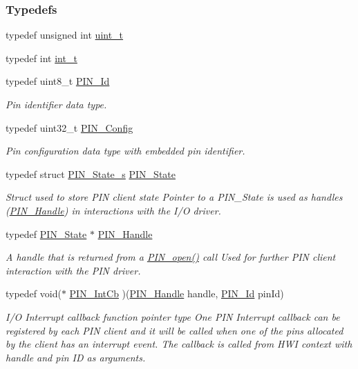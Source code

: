 \subsubsection*{Typedefs}
\begin{DoxyCompactItemize}
\item 
typedef unsigned int \hyperlink{_p_i_n_8h_a12a1e9b3ce141648783a82445d02b58d}{uint\-\_\-t}
\item 
typedef int \hyperlink{_p_i_n_8h_ab6fd6105e64ed14a0c9281326f05e623}{int\-\_\-t}
\item 
typedef uint8\-\_\-t \hyperlink{_p_i_n_8h_a9ae8197f460bb76ea09a84f47d09921f}{P\-I\-N\-\_\-\-Id}
\begin{DoxyCompactList}\small\item\em Pin identifier data type. \end{DoxyCompactList}\item 
typedef uint32\-\_\-t \hyperlink{_p_i_n_8h_ae427b7d2925f9b0f3145e455cfdb5841}{P\-I\-N\-\_\-\-Config}
\begin{DoxyCompactList}\small\item\em Pin configuration data type with embedded pin identifier. \end{DoxyCompactList}\item 
typedef struct \hyperlink{struct_p_i_n___state__s}{P\-I\-N\-\_\-\-State\-\_\-s} \hyperlink{_p_i_n_8h_a36ef69d50df6baa6973482669c24a522}{P\-I\-N\-\_\-\-State}
\begin{DoxyCompactList}\small\item\em Struct used to store P\-I\-N client state Pointer to a P\-I\-N\-\_\-\-State is used as handles (\hyperlink{_p_i_n_8h_afb2de52b054638f63c39df1f30a0d88d}{P\-I\-N\-\_\-\-Handle}) in interactions with the I/\-O driver. \end{DoxyCompactList}\item 
typedef \hyperlink{_p_i_n_8h_a36ef69d50df6baa6973482669c24a522}{P\-I\-N\-\_\-\-State} $\ast$ \hyperlink{_p_i_n_8h_afb2de52b054638f63c39df1f30a0d88d}{P\-I\-N\-\_\-\-Handle}
\begin{DoxyCompactList}\small\item\em A handle that is returned from a \hyperlink{_p_i_n_8h_a731c5bb641ffeb064579432adfc8dba0}{P\-I\-N\-\_\-open()} call Used for further P\-I\-N client interaction with the P\-I\-N driver. \end{DoxyCompactList}\item 
typedef void($\ast$ \hyperlink{_p_i_n_8h_a9194f02a570a8f5595a2acd2723b8fac}{P\-I\-N\-\_\-\-Int\-Cb} )(\hyperlink{_p_i_n_8h_afb2de52b054638f63c39df1f30a0d88d}{P\-I\-N\-\_\-\-Handle} handle, \hyperlink{_p_i_n_8h_a9ae8197f460bb76ea09a84f47d09921f}{P\-I\-N\-\_\-\-Id} pin\-Id)
\begin{DoxyCompactList}\small\item\em I/\-O Interrupt callback function pointer type One P\-I\-N Interrupt callback can be registered by each P\-I\-N client and it will be called when one of the pins allocated by the client has an interrupt event. The callback is called from H\-W\-I context with handle and pin I\-D as arguments. \end{DoxyCompactList}\end{DoxyCompactItemize}
